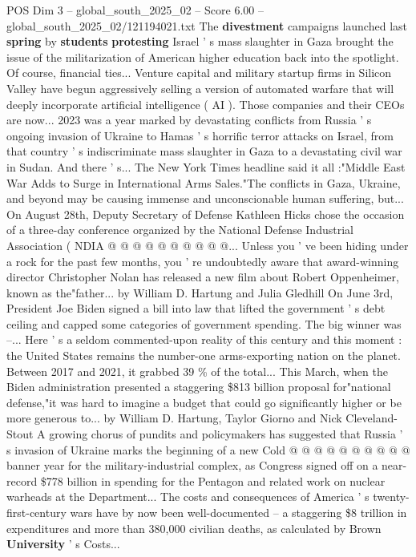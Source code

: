 \begin{textsample}{POS Dim 3 – global\_south\_2025\_02 – Score 6.00 – global\_south\_2025\_02/121194021.txt}  \label{ex:f3_pos_442}
The \textbf{divestment} campaigns launched last \textbf{spring} by \textbf{students} \textbf{protesting} Israel ' s mass slaughter in Gaza brought the issue of the militarization of American higher education back into the spotlight.
Of course, financial ties...
Venture capital and military startup firms in Silicon Valley have begun aggressively selling a version of automated warfare that will deeply incorporate artificial intelligence ( AI ).
Those companies and their CEOs are now... 2023 was a year marked by devastating conflicts from Russia ' s ongoing invasion of Ukraine to Hamas ' s horrific terror attacks on Israel, from that country ' s indiscriminate mass slaughter in Gaza to a devastating civil war in Sudan.
And there ' s...
The New York Times headline said it all :"Middle East War Adds to Surge in International Arms Sales."The conflicts in Gaza, Ukraine, and beyond may be causing immense and unconscionable human suffering, but...
On August 28th, Deputy Secretary of Defense Kathleen Hicks chose the occasion of a three-day conference organized by the National Defense Industrial Association ( NDIA @ @ @ @ @ @ @ @ @ @...
Unless you ' ve been hiding under a rock for the past few months, you ' re undoubtedly aware that award-winning director Christopher Nolan has released a new film about Robert Oppenheimer, known as the"father... by William D.
Hartung and Julia Gledhill On June 3rd, President Joe Biden signed a bill into law that lifted the government ' s debt ceiling and capped some categories of government spending.
The big winner was --...
Here ' s a seldom commented-upon reality of this century and this moment : the United States remains the number-one arms-exporting nation on the planet.
Between 2017 and 2021, it grabbed 39 \% of the total...
This March, when the Biden administration presented a staggering \$813 billion proposal for"national defense,"it was hard to imagine a budget that could go significantly higher or be more generous to... by William D.
Hartung, Taylor Giorno and Nick Cleveland-Stout A growing chorus of pundits and policymakers has suggested that Russia ' s invasion of Ukraine marks the beginning of a new Cold @ @ @ @ @ @ @ @ @ @ banner year for the military-industrial complex, as Congress signed off on a near-record \$778 billion in spending for the Pentagon and related work on nuclear warheads at the Department...
The costs and consequences of America ' s twenty-first-century wars have by now been well-documented -- a staggering \$8 trillion in expenditures and more than 380,000 civilian deaths, as calculated by Brown \textbf{University} ' s Costs...

\end{textsample}

